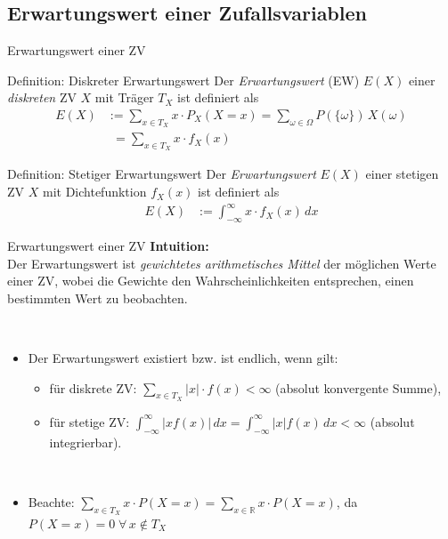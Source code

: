 \documentclass[
  10pt,
  ignorenonframetext,
]{beamer}
\providecommand{\tightlist}{%
  \setlength{\itemsep}{0pt}\setlength{\parskip}{0pt}}
\begin{document}
\subsection{Erwartungswert einer
Zufallsvariablen}\label{erwartungswert-einer-zufallsvariablen}

\begin{frame}{Erwartungswert einer ZV}
\label{erwartungswert-einer-zv}
\begin{block}{Definition: Diskreter Erwartungswert}
\label{definition-diskreter-erwartungswert}
Der \emph{Erwartungswert} (EW) \(E(X)\) einer \emph{diskreten} ZV \(X\)
mit Träger \(T_X\) ist definiert als \begin{align*}
E(X) &:= \sum_{x \in T_X} x \cdot P_{X}(X = x) = \sum_{\omega \in \Omega} P(\{\omega\}) \, X(\omega)\\
      &\phantom{:}=\sum_{x \in T_X} x \cdot f_X(x)
\end{align*}
\end{block}

\begin{block}{Definition: Stetiger Erwartungswert}
\label{definition-stetiger-erwartungswert}
Der \emph{Erwartungswert} \(E(X)\) einer stetigen ZV \(X\) mit
Dichtefunktion \(f_X(x)\) ist definiert als \begin{align*}
E(X) &:= \int_{-\infty}^\infty x \cdot f_X(x) \,dx
\end{align*}
\end{block}
\end{frame}

\begin{frame}{Erwartungswert einer ZV}
\label{erwartungswert-einer-zv-1}
\textbf{Intuition:}\\
Der Erwartungswert ist \emph{gewichtetes arithmetisches Mittel} der
möglichen Werte einer ZV, wobei die Gewichte den Wahrscheinlichkeiten
entsprechen, einen bestimmten Wert zu beobachten.\\
\strut ~

\begin{itemize}
\item
  Der Erwartungswert existiert bzw. ist endlich, wenn gilt:

  \begin{itemize}
  \tightlist
  \item
    für diskrete ZV: \(\sum_{x \in T_X} |x| \cdot f(x) < \infty\)
    (absolut konvergente Summe),
  \item
    für stetige ZV:
    \(\int_{-\infty}^\infty |x f(x)| \,dx = \int_{-\infty}^\infty |x| f(x) \,dx< \infty\)
    (absolut integrierbar).
  \end{itemize}
\end{itemize}

~

\begin{itemize}
\tightlist
\item
  Beachte:
  \(\sum_{x \in T_X} x \cdot P(X = x) = \sum_{x \in \mathbb{R}} x \cdot P(X = x)\),
  da \(P(X = x) = 0 \;\forall\, x \notin T_X\)
\end{itemize}
\end{frame}
\end{document}
